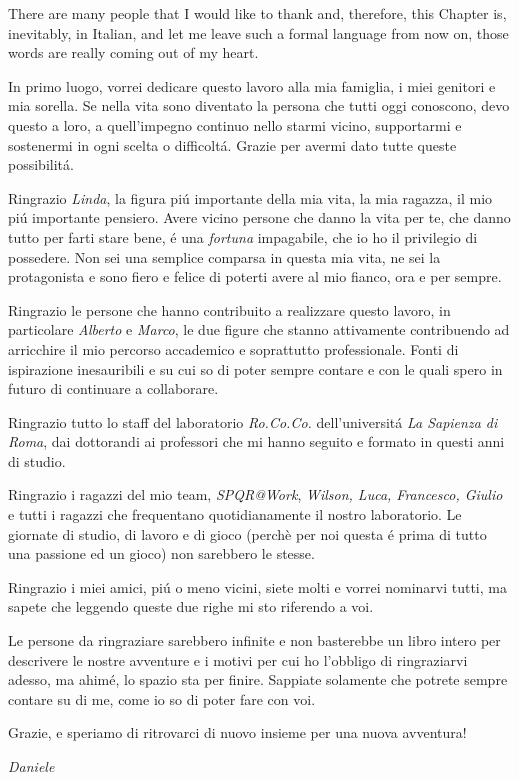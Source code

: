 \newpage

\begin{acknowledgements}
There are many people that I would like to thank and, therefore, this Chapter is, inevitably, in Italian, and let me leave such a formal language from now on, those words are really coming out of my heart.

In primo luogo, vorrei dedicare questo lavoro alla mia famiglia, i miei genitori e mia sorella. Se nella vita sono diventato la persona che tutti oggi conoscono, devo questo a loro, a quell'impegno continuo nello starmi vicino, supportarmi e sostenermi in ogni scelta o difficolt\'a. Grazie per avermi dato tutte queste possibilit\'a.

Ringrazio \emph{Linda}, la figura pi\'u importante della mia vita, la mia ragazza, il mio pi\'u importante pensiero. Avere vicino persone che danno la vita per te, che danno tutto per farti stare bene, \'e una \emph{fortuna} impagabile, che io ho il privilegio di possedere. Non sei una semplice comparsa in questa mia vita, ne sei la protagonista e sono fiero e felice di poterti avere al mio fianco, ora e per sempre.

Ringrazio le persone che hanno contribuito a realizzare questo lavoro, in particolare \emph{Alberto} e \emph{Marco}, le due figure che stanno attivamente contribuendo ad arricchire il mio percorso accademico e soprattutto professionale. Fonti di ispirazione inesauribili e su cui so di poter sempre contare e con le quali spero in futuro di continuare a collaborare.

Ringrazio tutto lo staff del laboratorio \emph{Ro.Co.Co.} dell'universit\'a \emph{La Sapienza di Roma}, dai dottorandi ai professori che mi hanno seguito e formato in questi anni di studio.

Ringrazio i ragazzi del mio team, \emph{SPQR@Work}, \emph{Wilson, Luca, Francesco, Giulio} e tutti i ragazzi che frequentano quotidianamente il nostro laboratorio. Le giornate di studio, di lavoro e di gioco (perchè per noi questa \'e prima di tutto una passione ed un gioco) non sarebbero le stesse.

Ringrazio i miei amici, pi\'u o meno vicini, siete molti e vorrei nominarvi tutti, ma sapete che leggendo queste due righe mi sto riferendo a voi.

Le persone da ringraziare sarebbero infinite e non basterebbe un libro intero per descrivere le nostre avventure e i motivi per cui ho l'obbligo di ringraziarvi adesso, ma ahim\'e, lo spazio sta per finire. Sappiate solamente che potrete sempre contare su di me, come io so di poter fare con voi.

Grazie, e speriamo di ritrovarci di nuovo insieme per una nuova avventura!

\emph{Daniele}
\end{acknowledgements}